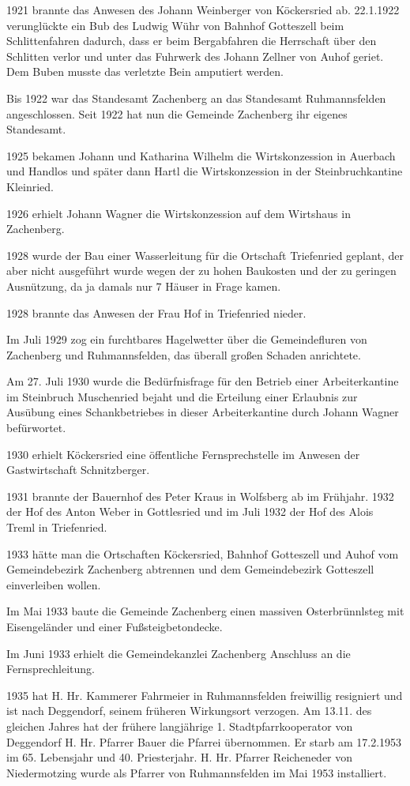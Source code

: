 1921 brannte das Anwesen des Johann Weinberger von Köckersried ab. 22.1.1922
verunglückte ein Bub des Ludwig Wühr von Bahnhof Gotteszell beim Schlittenfahren
dadurch, dass er beim Bergabfahren die Herrschaft über den Schlitten verlor und
unter das Fuhrwerk des Johann Zellner von Auhof geriet. Dem Buben musste das
verletzte Bein amputiert werden.

Bis 1922 war das Standesamt Zachenberg an das Standesamt Ruhmannsfelden
angeschlossen. Seit 1922 hat nun die Gemeinde Zachenberg ihr eigenes Standesamt.

1925 bekamen Johann und Katharina Wilhelm die Wirtskonzession in Auerbach und
Handlos und später dann Hartl die Wirtskonzession in der Steinbruchkantine
Kleinried.

1926 erhielt Johann Wagner die Wirtskonzession auf dem Wirtshaus in Zachenberg.

1928 wurde der Bau einer Wasserleitung für die Ortschaft Triefenried geplant,
der aber nicht ausgeführt wurde wegen der zu hohen Baukosten und der zu geringen
Ausnützung, da ja damals nur 7 Häuser in Frage kamen.

1928 brannte das Anwesen der Frau Hof in Triefenried nieder.

Im Juli 1929 zog ein furchtbares Hagelwetter über die Gemeindefluren von
Zachenberg und Ruhmannsfelden, das überall großen Schaden anrichtete.

Am 27. Juli 1930 wurde die Bedürfnisfrage für den Betrieb einer Arbeiterkantine
im Steinbruch Muschenried bejaht und die Erteilung einer Erlaubnis zur Ausübung
eines Schankbetriebes in dieser Arbeiterkantine durch Johann Wagner befürwortet.

1930 erhielt Köckersried eine öffentliche Fernsprechstelle im Anwesen der
Gastwirtschaft Schnitzberger.

1931 brannte der Bauernhof des Peter Kraus in Wolfsberg ab im Frühjahr. 1932 der
Hof des Anton Weber in Gottlesried und im Juli 1932 der Hof des Alois Treml in
Triefenried.

1933 hätte man die Ortschaften Köckersried, Bahnhof Gotteszell und Auhof vom
Gemeindebezirk Zachenberg abtrennen und dem Gemeindebezirk Gotteszell
einverleiben wollen.

Im Mai 1933 baute die Gemeinde Zachenberg einen massiven Osterbrünnlsteg mit
Eisengeländer und einer Fußsteigbetondecke.

Im Juni 1933 erhielt die Gemeindekanzlei Zachenberg Anschluss an die
Fernsprechleitung.

1935 hat H. Hr. Kammerer Fahrmeier in Ruhmannsfelden freiwillig resigniert und
ist nach Deggendorf, seinem früheren Wirkungsort verzogen. Am 13.11. des
gleichen Jahres hat der frühere langjährige 1. Stadtpfarrkooperator von
Deggendorf H. Hr. Pfarrer Bauer die Pfarrei übernommen. Er starb am 17.2.1953 im
65. Lebensjahr und 40. Priesterjahr. H. Hr. Pfarrer Reicheneder von
Niedermotzing wurde als Pfarrer von Ruhmannsfelden im Mai 1953 installiert.

